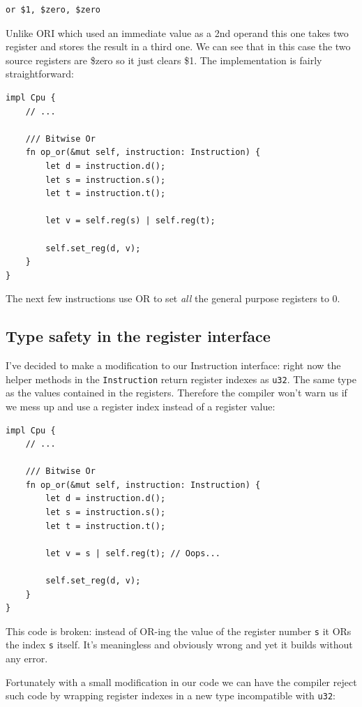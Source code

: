 \documentclass[a4paper]{article}
\newcommand{\code}[1] {\texttt{#1}}
\begin{document}
\begin{lstlisting}[language=assembly]
or $1, $zero, $zero
\end{lstlisting}

Unlike ORI which used an immediate value as a 2nd operand this one
takes two register and stores the result in a third one. We can see
that in this case the two source registers are \$zero so it just
clears \$1. The implementation is fairly straightforward:

\begin{lstlisting}
impl Cpu {
    // ...

    /// Bitwise Or
    fn op_or(&mut self, instruction: Instruction) {
        let d = instruction.d();
        let s = instruction.s();
        let t = instruction.t();

        let v = self.reg(s) | self.reg(t);

        self.set_reg(d, v);
    }
}
\end{lstlisting}

The next few instructions use OR to set \emph{all} the general purpose
registers to 0.

\subsection{Type safety in the register interface}

I've decided to make a modification to our Instruction interface:
right now the helper methods in the \code{Instruction} return
register indexes as \code{u32}. The same type as the values
contained in the registers. Therefore the compiler won't warn us if we
mess up and use a register index instead of a register value:

\begin{lstlisting}
impl Cpu {
    // ...

    /// Bitwise Or
    fn op_or(&mut self, instruction: Instruction) {
        let d = instruction.d();
        let s = instruction.s();
        let t = instruction.t();

        let v = s | self.reg(t); // Oops...

        self.set_reg(d, v);
    }
}
\end{lstlisting}

This code is broken: instead of OR-ing the value of the register
number \code{s} it ORs the index \code{s} itself. It's meaningless
and obviously wrong and yet it builds without any error.

Fortunately with a small modification in our code we can have the
compiler reject such code by wrapping register indexes in a new type
incompatible with \code{u32}:
\end{document}
